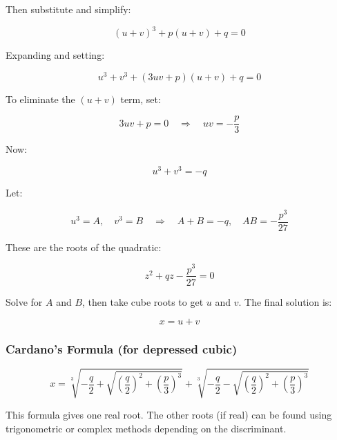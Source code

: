 Then substitute and simplify:

\[
    {(u+v)}^3 + p(u+v) + q = 0
\]

Expanding and setting:

\[
    u^3 + v^3 + (3uv + p)(u+v) + q = 0
\]

To eliminate the \((u+v)\) term, set:

\[
    3uv + p = 0 \quad \Rightarrow \quad uv = -\frac{p}{3}
\]

Now:

\[
    u^3 + v^3 = -q
\]

Let:

\[
    u^3 = A, \quad v^3 = B \quad \Rightarrow \quad A + B = -q, \quad AB = -\frac{p^3}{27}
\]

These are the roots of the quadratic:

\[
    z^2 + qz - \frac{p^3}{27} = 0
\]

Solve for \(A\) and \(B\), then take cube roots to get \(u\) and \(v\). The final solution is:

\[
    x = u + v
\]

\subsubsection{Cardano’s Formula (for depressed cubic)}

\[
    x = \sqrt[3]{-\frac{q}{2} + \sqrt{{\left(\frac{q}{2}\right)}^2 + {\left(\frac{p}{3}\right)}^3}} + 
    \sqrt[3]{-\frac{q}{2} - \sqrt{{\left(\frac{q}{2}\right)}^2 + {\left(\frac{p}{3}\right)}^3}}
\]

This formula gives one real root. The other roots (if real) can be found using trigonometric or complex 
methods depending on the discriminant.

